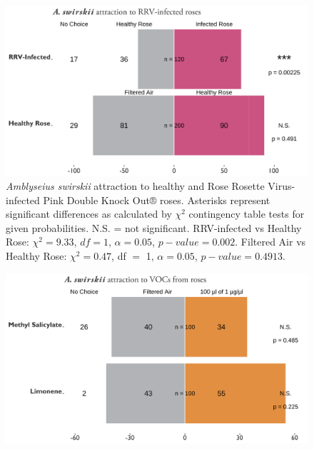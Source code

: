 \documentclass{ufdissertation}[overrideChapters] %
\begin{document}
{\begin{figure}
{\centering \includegraphics[width=1\linewidth]{figure/rrv_graph_olfact_rose} 

}

\caption[\textit{Amblyseius swirskii} attraction to healthy and Rose Rosette Virus-infected Pink Double Knock Out® roses]{\textit{Amblyseius swirskii} attraction to healthy and Rose Rosette Virus-infected Pink Double Knock Out® roses. Asterisks represent significant differences as calculated by $\chi^2$ contingency table tests for given probabilities. N.S. = not significant. RRV-infected vs Healthy Rose: $\chi^2 = 9.33$, $df = 1$, $\alpha = 0.05$, $p-value = 0.002$. Filtered Air vs Healthy Rose: $\chi^2 = 0.47$, df $=$ 1, $\alpha = 0.05$, $p-value = 0.4913$.}\label{fig:aswir-rrd}
\end{figure}
\begin{figure}

{\centering \includegraphics[width=1\linewidth]{figure/rrv_graph_olfact_vocs} 

}


\end{figure}}
\end{document}
